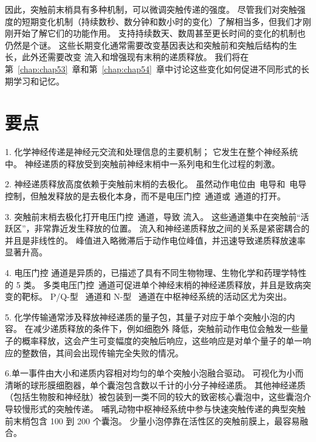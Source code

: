 因此，突触前末梢具有多种机制，可以微调突触传递的强度。
尽管我们对突触强度的短期变化机制（持续数秒、数分钟和数小时的变化）了解相当多，但我们才刚刚开始了解它们的功能作用。
支持持续数天、数周甚至更长时间的变化的机制也仍然是个谜。
这些长期变化通常需要改变基因表达和突触前和突触后结构的生长，此外还需要改变  流入和增强现有末稍的递质释放。
我们将在第~\ref{chap:chap53}~章和第~\ref{chap:chap54}~章中讨论这些变化如何促进不同形式的长期学习和记忆。



\section{要点}

1. 化学神经传递是神经元交流和处理信息的主要机制； 它发生在整个神经系统中。
神经递质的释放受到突触前神经末梢中一系列电和生化过程的刺激。


2. 神经递质释放高度依赖于突触前末梢的去极化。
虽然动作电位由~电导和~电导控制，但触发释放的是去极化本身，而不是电压门控~通道或~通道的打开。


3. 突触前末梢去极化打开电压门控~通道，导致  流入。
这些通道集中在突触前“活跃区”，非常靠近发生释放的位置。
 流入和神经递质释放之间的关系是紧密耦合的并且是非线性的。
 峰值进入略微滞后于动作电位峰值，并迅速导致递质释放速率显著升高。 


4. 电压门控 通道是异质的，已描述了具有不同生物物理、生物化学和药理学特性的 5 类。
多类电压门控~通道可促进单个神经末梢的神经递质释放，并且是致病突变的靶标。
P/Q-型~ 通道和 N-型~ 通道在中枢神经系统的活动区尤为突出。


5. 化学传输通常涉及释放神经递质的量子包，其量子对应于单个突触小泡的内容。
在减少递质释放的条件下，例如细胞外  降低，突触前动作电位会触发一些量子的概率释放，这会产生可变幅度的突触后响应，这些响应是对单个量子的单一响应的整数倍，其间会出现传输完全失败的情况。


6.单一事件由大小和递质内容相对均匀的单个突触小泡融合驱动。
可视化为小而清晰的球形膜细胞器，单个囊泡包含数以千计的小分子神经递质。
其他神经递质（包括生物胺和神经肽）被包装到一类不同的较大的致密核心囊泡中，这些囊泡介导较慢形式的突触传递。
哺乳动物中枢神经系统中参与快速突触传递的典型突触前末梢包含 100 到 200 个囊泡。
少量小泡停靠在活性区的突触前膜上，最容易融合。


